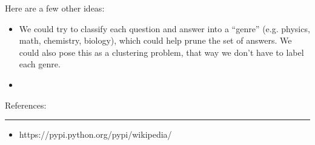 \documentclass{article}
\newcommand{\problemline}{\rule{\textwidth}{0.25mm}}
\theoremstyle{mystuff}
\theoremstyle{myexample}
\theoremstyle{named}
\begin{document}
Here are a few other ideas:
\begin{itemize}
   \item We could try to classify each question and answer into a ``genre'' (e.g. physics, math, chemistry, biology), which could help prune the set of answers.  We could also pose this as a clustering problem, that way we don't have to label each genre.
   \item 
\end{itemize}

References:\\
\problemline
\begin{itemize}
   \item https://pypi.python.org/pypi/wikipedia/
\end{itemize}

%
%
\end{document}
